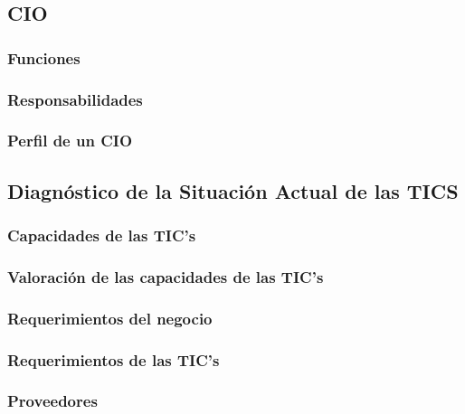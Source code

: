 
\subsection{CIO}
\subsubsection{Funciones}
\lipsum[1]
\subsubsection{Responsabilidades }
\lipsum[1]
\subsubsection{Perfil de un CIO}
\lipsum[1]




\subsection{Diagnóstico de la Situación Actual de las TICS}
\subsubsection{Capacidades de las TIC’s }
\lipsum[1]
\subsubsection{Valoración de las capacidades de las TIC’s }
\lipsum[1]
\subsubsection{Requerimientos del negocio}
\lipsum[1]
\subsubsection{Requerimientos de las TIC’s}
\lipsum[1]
\subsubsection{Proveedores }
